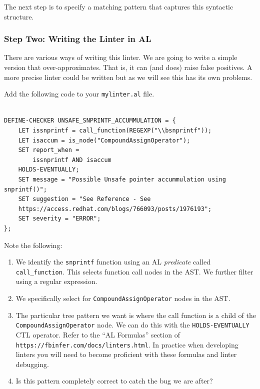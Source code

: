 The next step is to specify a matching pattern that captures this syntactic structure.

\subsubsection{Step Two: Writing the Linter in AL}

There are various ways of writing this linter. 
We are going to write a simple version that over-approximates. That is, it can (and does) raise 
false positives. A more precise linter could be written but as we will see this has 
its own problems.

Add the following code to your \verb|mylinter.al| file.

\begin{verbatim}

DEFINE-CHECKER UNSAFE_SNPRINTF_ACCUMMULATION = {
    LET issnprintf = call_function(REGEXP("\\bsnprintf"));
    LET isaccum = is_node("CompoundAssignOperator");
    SET report_when = 
        issnprintf AND isaccum
    HOLDS-EVENTUALLY;
    SET message = "Possible Unsafe pointer accummulation using snprintf()";
    SET suggestion = "See Reference - See 
    https://access.redhat.com/blogs/766093/posts/1976193";
    SET severity = "ERROR";
};
\end{verbatim}

Note the following:
\begin{enumerate}
	\item We identify the \verb|snprintf| function using an AL \textit{predicate} called
	\verb|call_function|. This selects function call nodes in the AST. We further filter
	using a regular expression.
	\item We specifically select for \verb|CompoundAssignOperator| nodes in the AST.
	\item The particular tree pattern we want is where the call function is a child 
	of the \verb|CompoundAssignOperator| node. We can do this with the \verb|HOLDS-EVENTUALLY|
	CTL operator. Refer to the ``AL Formulas'' section of\\
	 \verb|https://fbinfer.com/docs/linters.html|. 
	In practice when developing linters you will need to become proficient with these formulas
	and linter debugging.
	\item Is this pattern completely correct to catch the bug we are after?	
\end{enumerate}


